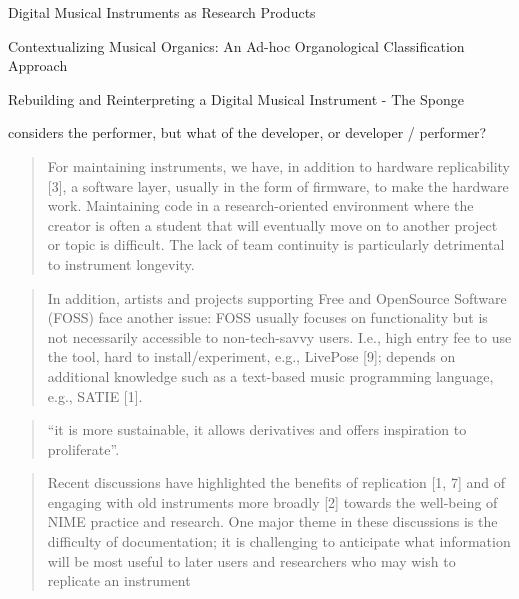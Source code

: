 \item Digital Musical Instruments as Research Products
\item Contextualizing Musical Organics: An Ad-hoc Organological Classification Approach
\item Rebuilding and Reinterpreting a Digital Musical Instrument - The Sponge

\cite{meneses_puara_2023} considers the performer, but what of the developer, or developer / performer?

\begin{quote}
    For maintaining instruments, we have, in addition to hardware replicability [3], a software layer, usually in the form of
    firmware, to make the hardware work. Maintaining code in
    a research-oriented environment where the creator is often a
    student that will eventually move on to another project or
    topic is difficult. The lack of team continuity is particularly
    detrimental to instrument longevity.
\end{quote}


\begin{quote}
    In addition, artists and projects supporting Free and OpenSource Software (FOSS) face another issue: FOSS usually
    focuses on functionality but is not necessarily accessible to
    non-tech-savvy users. I.e., high entry fee to use the tool,
    hard to install/experiment, e.g., LivePose [9]; depends on additional knowledge such as a text-based music programming
    language, e.g., SATIE [1].
\end{quote}


\cite{morreale_design_2017}

\begin{quote}
    “it is more sustainable, it allows derivatives
    and offers inspiration to proliferate”.
\end{quote}



\cite{west_towards_2025}

\begin{quote}
    Recent discussions have highlighted the benefits of replication
        [1, 7] and of engaging with old instruments more broadly [2]
    towards the well-being of NIME practice and research. One major
    theme in these discussions is the difficulty of documentation; it
    is challenging to anticipate what information will be most useful
    to later users and researchers who may wish to replicate an
    instrument
\end{quote}


